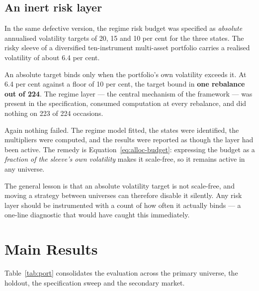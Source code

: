 \subsection{An inert risk layer}

In the same defective version, the regime risk budget was specified as \emph{absolute} annualised
volatility targets of 20, 15 and 10 per cent for the three states. The risky sleeve of a
diversified ten-instrument multi-asset portfolio carries a realised volatility of about 6.4 per
cent.

An absolute target binds only when the portfolio's own volatility exceeds it. At 6.4 per cent
against a floor of 10 per cent, the target bound in \textbf{one rebalance out of 224}. The regime
layer --- the central mechanism of the framework --- was present in the specification, consumed
computation at every rebalance, and did nothing on 223 of 224 occasions.

Again nothing failed. The regime model fitted, the states were identified, the multipliers were
computed, and the results were reported as though the layer had been active. The remedy is
Equation~\eqref{eq:alloc-budget}: expressing the budget as a \emph{fraction of the sleeve's own
volatility} makes it scale-free, so it remains active in any universe.

The general lesson is that an absolute volatility target is not scale-free, and moving a strategy
between universes can therefore disable it silently. Any risk layer should be instrumented with a
count of how often it actually binds --- a one-line diagnostic that would have caught this
immediately.

\section{Main Results}
\label{sec:alloc-main}

Table~\ref{tab:port} consolidates the evaluation across the primary universe, the holdout, the
specification sweep and the secondary market.

